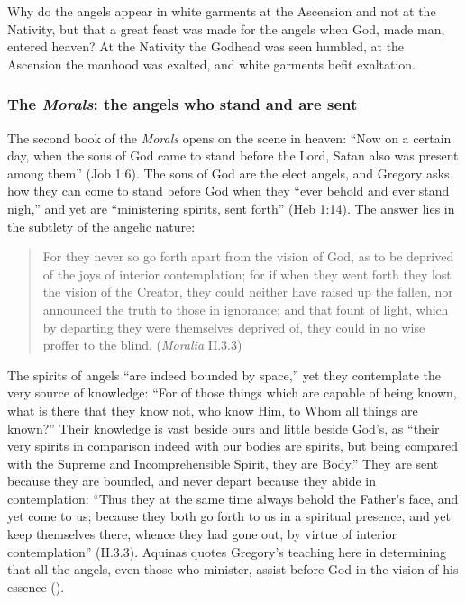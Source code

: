 \noindent Why do the angels appear in white garments at the Ascension and not
at the Nativity, but that a great feast was made for the angels when God, made
man, entered heaven? At the Nativity the Godhead was seen humbled, at the
Ascension the manhood was exalted, and white garments befit exaltation.

\subsubsection{The \emph{Morals}: the angels who stand and are sent}

The second book of the \emph{Morals} opens on the scene in heaven: ``Now on
a certain day, when the sons of God came to stand before the Lord, Satan also
was present among them'' (Job 1:6). The sons of God are the elect angels, and
Gregory asks how they can come to stand before God when they ``ever behold
and ever stand nigh,'' and yet are ``ministering spirits, sent forth'' (Heb
1:14). The
answer lies in the subtlety of the angelic nature:

\begin{quote}
For they never so go forth apart from the vision of God, as to be deprived
of the joys of interior contemplation; for if when they went forth they lost
the vision of the Creator, they could neither have raised up the fallen, nor
announced the truth to those in ignorance; and that fount of light, which by
departing they were themselves deprived of, they could in no wise proffer to
the blind. (\emph{Moralia} II.3.3)
\end{quote}

\noindent The spirits of angels ``are indeed bounded by space,'' yet they
contemplate the very source of knowledge: ``For of those things which are
capable of being known, what is there that they know not, who know Him, to
Whom all things are known?'' Their knowledge is vast beside ours and little
beside God's, as ``their very spirits in comparison indeed with our bodies
are spirits, but being compared with the Supreme and Incomprehensible Spirit,
they are Body.'' They are sent because they are bounded, and never depart
because they abide in contemplation: ``Thus they at the same time always behold the
Father's face, and yet come to us; because they both go forth to us in a
spiritual presence, and yet keep themselves there, whence they had gone out,
by virtue of interior contemplation'' (II.3.3). Aquinas quotes Gregory's
teaching here in determining that all the angels, even those who minister, assist before
God in the vision of his essence ().

